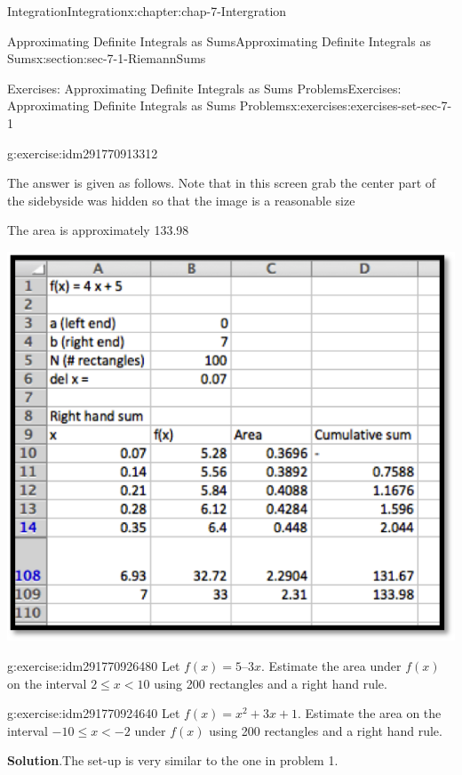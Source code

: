 \documentclass[oneside,10pt,]{book}
\numberwithin{equation}{section}
\newcommand{\lt}{<}
\begin{document}
\begin{chapterptx}{Integration}{}{Integration}{}{}{x:chapter:chap-7-Intergration}
\begin{sectionptx}{Approximating Definite Integrals as Sums}{}{Approximating Definite Integrals as Sums}{}{}{x:section:sec-7-1-RiemannSums}
\begin{exercises-subsection}{Exercises: Approximating Definite Integrals as Sums Problems}{}{Exercises: Approximating Definite Integrals as Sums Problems}{}{}{x:exercises:exercises-set-sec-7-1}
\begin{divisionexercise}{1}{}{}{g:exercise:idm291770913312}
\begin{sidebyside}{1}{0}{0}{0}
\begin{sbspanel}{1}
\end{sbspanel}%
\end{sidebyside}%
\par
The answer is given as follows. Note that in this screen grab the center part of the sidebyside was hidden so that the image is a reasonable size%
\par
The area is approximately 133.98%
\begin{sidebyside}{1}{0.2}{0.2}{0}%
\begin{sbspanel}{0.6}%
\includegraphics[width=\linewidth]{images/sec7-1-sol1b.png}
\end{sbspanel}%
\end{sidebyside}%
\end{divisionexercise}%
\begin{divisionexercise}{2}{}{}{g:exercise:idm291770926480}%
Let \(f(x) = 5 – 3 x\).  Estimate the area under \(f(x)\) on the interval \(2 \le  x \lt 10\) using 200 rectangles and a right hand rule.%
\end{divisionexercise}%
\begin{divisionexercise}{3}{}{}{g:exercise:idm291770924640}%
Let \(f(x) = x^2  + 3 x + 1\).  Estimate the area on the interval \(-10\le  x \lt -2\) under \(f(x)\) using 200 rectangles and a right hand rule.%
\par\smallskip%
\noindent\textbf{Solution}.\hypertarget{g:solution:idm291770963840}{}\quad{}The set-up is very similar to the one in problem 1.%
\begin{sidebyside}{1}{0}{0}{0}%

\end{sidebyside}
\end{divisionexercise}
\end{exercises-subsection}
\end{sectionptx}
\end{chapterptx}
\end{document}

